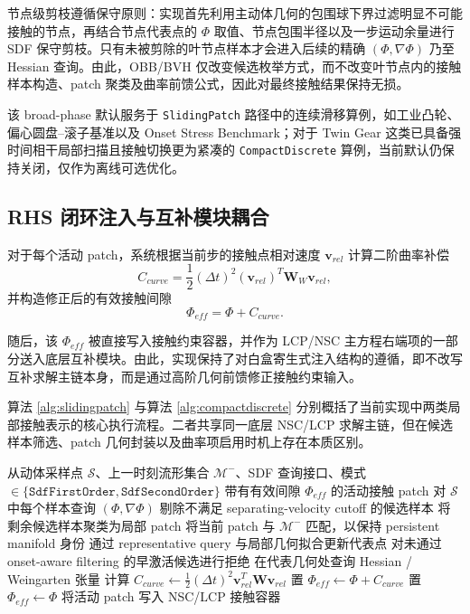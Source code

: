 节点级剪枝遵循保守原则：实现首先利用主动体几何的包围球下界过滤明显不可能接触的节点，再结合节点代表点的 $\Phi$ 取值、节点包围半径以及一步运动余量进行 SDF 保守剪枝。只有未被剪除的叶节点样本才会进入后续的精确 $(\Phi,\nabla\Phi)$ 乃至 Hessian 查询。由此，OBB/BVH 仅改变候选枚举方式，而不改变叶节点内的接触样本构造、patch 聚类及曲率前馈公式，因此对最终接触结果保持无损。

该 broad-phase 默认服务于 \texttt{SlidingPatch} 路径中的连续滑移算例，如工业凸轮、偏心圆盘--滚子基准以及 Onset Stress Benchmark；对于 Twin Gear 这类已具备强时间相干局部扫描且接触切换更为紧凑的 \texttt{CompactDiscrete} 算例，当前默认仍保持关闭，仅作为离线可选优化。

\subsection{RHS 闭环注入与互补模块耦合}

对于每个活动 patch，系统根据当前步的接触点相对速度 $\mathbf{v}_{rel}$ 计算二阶曲率补偿
\begin{equation}
    C_{curve} = \frac{1}{2} (\Delta t)^2 (\mathbf{v}_{rel})^T \mathbf{W}_{W} \mathbf{v}_{rel},
\end{equation}
并构造修正后的有效接触间隙
\begin{equation}
    \Phi_{eff} = \Phi + C_{curve}.
\end{equation}

随后，该 $\Phi_{eff}$ 被直接写入接触约束容器，并作为 LCP/NSC 主方程右端项的一部分送入底层互补模块。由此，实现保持了对白盒寄生式注入结构的遵循，即不改写互补求解主链本身，而是通过高阶几何前馈修正接触约束输入。

算法 \ref{alg:slidingpatch} 与算法 \ref{alg:compactdiscrete} 分别概括了当前实现中两类局部接触表示的核心执行流程。二者共享同一底层 NSC/LCP 求解主链，但在候选样本筛选、patch 几何封装以及曲率项启用时机上存在本质区别。

\begin{algorithm}[htbp]
\caption{面向光滑连续接触的 \texttt{SlidingPatch} 流程}
\label{alg:slidingpatch}
\begin{algorithmic}[1]
\Require 从动体采样点 $\mathcal{S}$、上一时刻流形集合 $\mathcal{M}^{-}$、SDF 查询接口、模式 $\in \{\texttt{SdfFirstOrder},\texttt{SdfSecondOrder}\}$
\Ensure 带有有效间隙 $\Phi_{eff}$ 的活动接触 patch
\State 对 $\mathcal{S}$ 中每个样本查询 $(\Phi,\nabla \Phi)$
\State 剔除不满足 separating-velocity cutoff 的候选样本
\State 将剩余候选样本聚类为局部 patch
\State 将当前 patch 与 $\mathcal{M}^{-}$ 匹配，以保持 persistent manifold 身份
\State 通过 representative query 与局部几何拟合更新代表点
\State 对未通过 onset-aware filtering 的早激活候选进行拒绝
    \State 在代表几何处查询 Hessian / Weingarten 张量
    \State 计算 $C_{curve} \gets \frac{1}{2}(\Delta t)^2 \mathbf{v}_{rel}^{T}\mathbf{W}\mathbf{v}_{rel}$
    \State 置 $\Phi_{eff} \gets \Phi + C_{curve}$
\Else
    \State 置 $\Phi_{eff} \gets \Phi$
\EndIf
\State 将活动 patch 写入 NSC/LCP 接触容器
\end{algorithmic}
\end{algorithm}

